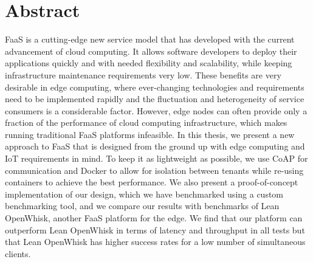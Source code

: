 \documentclass[a4paper, 11pt]{article}
\begin{document}


\newpage

\section*{Abstract}

FaaS is a cutting-edge new service model that has developed with the current advancement of cloud computing.
It allows software developers to deploy their applications quickly and with needed flexibility and scalability, while keeping infrastructure maintenance requirements very low.
These benefits are very desirable in edge computing, where ever-changing technologies and requirements need to be implemented rapidly and the fluctuation and heterogeneity of service consumers is a considerable factor.
However, edge nodes can often provide only a fraction of the performance of cloud computing infrastructure, which makes running traditional FaaS platforms infeasible.
In this thesis, we present a new approach to FaaS that is designed from the ground up with edge computing and IoT requirements in mind.
To keep it as lightweight as possible, we use CoAP for communication and Docker to allow for isolation between tenants while re-using containers to achieve the best performance.
We also present a proof-of-concept implementation of our design, which we have benchmarked using a custom benchmarking tool, and we compare our results with benchmarks of Lean OpenWhisk, another FaaS platform for the edge.
We find that our platform can outperform Lean OpenWhisk in terms of latency and throughput in all tests but that Lean OpenWhisk has higher success rates for a low number of simultaneous clients.
\end{document}
